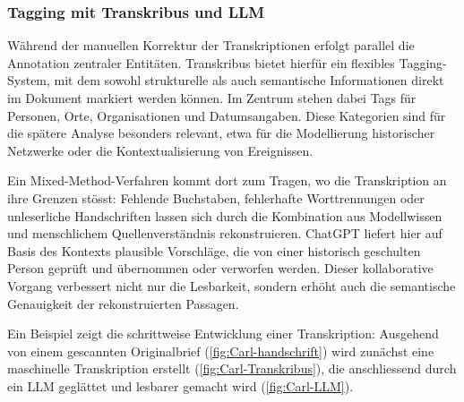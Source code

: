 \documentclass[12pt, a4paper, ngerman, bidi=default]{article}
\begin{document}
\subsubsection{Tagging mit Transkribus und LLM}\label{subsec:tagging_chatpter}

Während der manuellen Korrektur der Transkriptionen erfolgt parallel die Annotation zentraler Entitäten. 
Transkribus bietet hierfür ein flexibles Tagging-System, mit dem sowohl strukturelle als auch semantische Informationen direkt im Dokument markiert werden können. 
Im Zentrum stehen dabei Tags für Personen, Orte, Organisationen und Datumsangaben. Diese Kategorien sind für die spätere Analyse besonders relevant, 
etwa für die Modellierung historischer Netzwerke oder die Kontextualisierung von Ereignissen.

Ein Mixed-Method-Verfahren kommt dort zum Tragen, wo die Transkription an ihre Grenzen stösst: 
Fehlende Buchstaben, fehlerhafte Worttrennungen oder unleserliche Handschriften lassen sich durch die Kombination aus Modellwissen 
und menschlichem Quellenverständnis rekonstruieren. ChatGPT liefert hier auf Basis des Kontexts plausible Vorschläge, 
die von einer historisch geschulten Person geprüft und übernommen oder verworfen werden. Dieser kollaborative Vorgang verbessert 
nicht nur die Lesbarkeit, sondern erhöht auch die semantische Genauigkeit der rekonstruierten Passagen.

Ein Beispiel zeigt die schrittweise Entwicklung einer Transkription: Ausgehend von einem gescannten Originalbrief (\autoref{fig:Carl-handschrift}) 
wird zunächst eine maschinelle Transkription erstellt (\autoref{fig:Carl-Transkribus}), die anschliessend durch ein LLM geglättet und lesbarer gemacht wird (\autoref{fig:Carl-LLM}).
\end{document}
